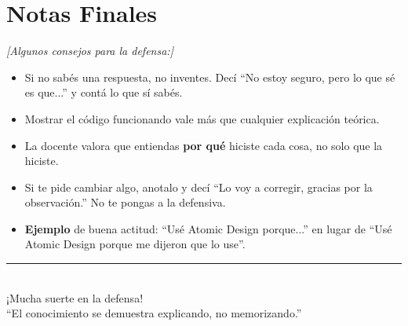 \documentclass[12pt, a4paper]{article}
\newcommand{\nota}[1]{%
  \textcolor{upds-gold}{\small\textit{[#1]}}%
}
\begin{document}
\section{Notas Finales}
\nota{Algunos consejos para la defensa:}

\begin{itemize}
  \item Si no sabés una respuesta, no inventes. Decí ``No estoy seguro, pero lo que sé es que...'' y contá lo que sí sabés.
  \item Mostrar el código funcionando vale más que cualquier explicación teórica.
  \item La docente valora que entiendas \textbf{por qué} hiciste cada cosa, no solo que la hiciste.
  \item Si te pide cambiar algo, anotalo y decí ``Lo voy a corregir, gracias por la observación.'' No te pongas a la defensiva.
  \item \textbf{Ejemplo} de buena actitud: ``Usé Atomic Design porque...'' en lugar de ``Usé Atomic Design porque me dijeron que lo use''.
\end{itemize}

\vfill
\begin{center}
{\color{upds-gold} \rule{0.5\textwidth}{0.5pt}}\\[0.3cm]
{\large ¡Mucha suerte en la defensa!}\\[0.1cm]
{\small ``El conocimiento se demuestra explicando, no memorizando.''}
\end{center}
\end{document}
